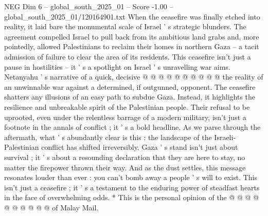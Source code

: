 \begin{textsample}{NEG Dim 6 – global\_south\_2025\_01 – Score -1.00 – global\_south\_2025\_01/120164901.txt}
When the ceasefire was finally etched into reality, it laid bare the monumental scale of Israel ' s strategic blunders.
The agreement compelled Israel to pull back from its ambitious land grabs and, more pointedly, allowed Palestinians to reclaim their homes in northern Gaza -- a tacit admission of failure to clear the area of its residents.
This ceasefire isn't just a pause in hostilities -- it ' s a spotlight on Israel ' s unravelling war aims.
Netanyahu ' s narrative of a quick, decisive @ @ @ @ @ @ @ @ @ @ the reality of an unwinnable war against a determined, if outgunned, opponent.
The ceasefire shatters any illusions of an easy path to subdue Gaza.
Instead, it highlights the resilience and unbreakable spirit of the Palestinian people.
Their refusal to be uprooted, even under the relentless barrage of a modern military, isn't just a footnote in the annals of conflict ; it ' s a bold headline.
As we parse through the aftermath, what ' s abundantly clear is this : the landscape of the Israeli-Palestinian conflict has shifted irreversibly.
Gaza ' s stand isn't just about survival ; it ' s about a resounding declaration that they are here to stay, no matter the firepower thrown their way.
And as the dust settles, this message resonates louder than ever : you can't bomb away a people ' s will to exist.
This isn't just a ceasefire ; it ' s a testament to the enduring power of steadfast hearts in the face of overwhelming odds. * This is the personal opinion of the @ @ @ @ @ @ @ @ @ @ of Malay Mail.

\end{textsample}
